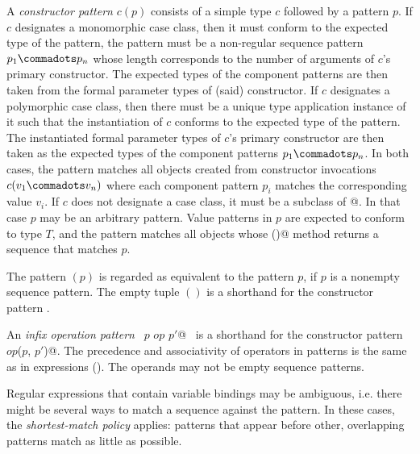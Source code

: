 \documentclass[a4paper,12pt,twoside,titlepage]{book}
\begin{document}
A {\em constructor pattern} $c ( p )$ consists of a simple type $c$
followed by a pattern $p$.  If $c$ designates a monomorphic case
class, then it must conform to the expected type of the pattern, the
pattern must be a non-regular sequence pattern $p_1 \commadots p_n$
whose length corresponds to the number of arguments of $c$'s primary
constructor. The expected types of the component patterns are then
taken from the formal parameter types of (said) constructor.  If $c$
designates a polymorphic case class, then there must be a unique type
application instance of it such that the instantiation of $c$ conforms
to the expected type of the pattern. The instantiated formal parameter
types of $c$'s primary constructor are then taken as the expected
types of the component patterns $p_1\commadots p_n$.  In both cases,
the pattern matches all objects created from constructor invocations
$c(v_1 \commadots v_n)$ where each component pattern $p_i$ matches the
corresponding value $v_i$. If $c$ does not designate a case class, it
must be a subclass of \lstinline@Seq[$T\,$]@. In that case $p$ may be an
arbitrary pattern. Value patterns in $p$ are expected to conform to
type $T$, and the pattern matches all objects whose \lstinline@elements()@
method returns a sequence that matches $p$.

The pattern $(p)$ is regarded as equivalent to the pattern $p$, if $p$
is a nonempty sequence pattern. The empty tuple $()$ is a shorthand
for the constructor pattern .

An {\em infix operation pattern} ~\lstinline@$p$ $op$ $p'$@~ is a shorthand for the
constructor pattern ~\lstinline@$op$($p$, $p'$)@.  The precedence and
associativity of operators in patterns is the same as in expressions
(). The operands may not be empty sequence
patterns.

Regular expressions that contain variable bindings may be ambiguous,
i.e. there might be several ways to match a sequence against the
pattern. In these cases, the \emph{shortest-match policy} applies:
patterns that appear before other, overlapping patterns match
as little as possible.
\end{document}
